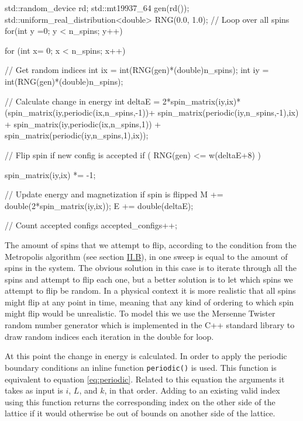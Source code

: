 \documentclass[reprint,english,notitlepage]{revtex4-1}  %
\begin{document}
\begin{cpp}
std::random_device rd;
std::mt19937_64 gen(rd());
std::uniform_real_distribution<double> RNG(0.0, 1.0);
// Loop over all spins
for(int y =0; y < n_spins; y++) {
  for (int x= 0; x < n_spins; x++){

    // Get random indices
    int ix = int(RNG(gen)*(double)n_spins);
    int iy = int(RNG(gen)*(double)n_spins);

    // Calculate change in energy
    int deltaE =  2*spin_matrix(iy,ix)*
                  (spin_matrix(iy,periodic(ix,n_spins,-1))+
                  spin_matrix(periodic(iy,n_spins,-1),ix) +
                  spin_matrix(iy,periodic(ix,n_spins,1)) +
                  spin_matrix(periodic(iy,n_spins,1),ix));


    // Flip spin if new config is accepted
    if ( RNG(gen) <= w(deltaE+8) ) {
      spin_matrix(iy,ix) *= -1;


      // Update energy and magnetization if spin is flipped
      M += double(2*spin_matrix(iy,ix));
      E += double(deltaE);

      // Count accepted configs
      accepted_configs++;
    }
  }
}
\end{cpp}

The amount of spins that we attempt to flip, according to the condition from the Metropolis algorithm (see section \hyperref[sec:II:b]{II.B}), in one sweep is equal to the amount of spins in the system. The obvious solution in this case is to iterate through all the spins and attempt to flip each one, but a better solution is to let which spins we attempt to flip be random. In a physical context it is more realistic that all spins might flip at any point in time, meaning that any kind of ordering to which spin might flip would be unrealistic. To model this we use the Mersenne Twister random number generator \citep{MersenneTwister} which is implemented in the C++ standard library to draw random indices each iteration in the double for loop. 

At this point the change in energy is calculated. In order to apply the periodic boundary conditions an inline function \verb+periodic()+ is used. This function is equivalent to equation \eqref{eq:periodic}. Related to this equation the arguments it takes as input is $i$, $L$, and $k$, in that order. Adding to an existing valid index using this function returns the corresponding index on the other side of the lattice if it would otherwise be out of bounds on another side of the lattice.
\end{document}
